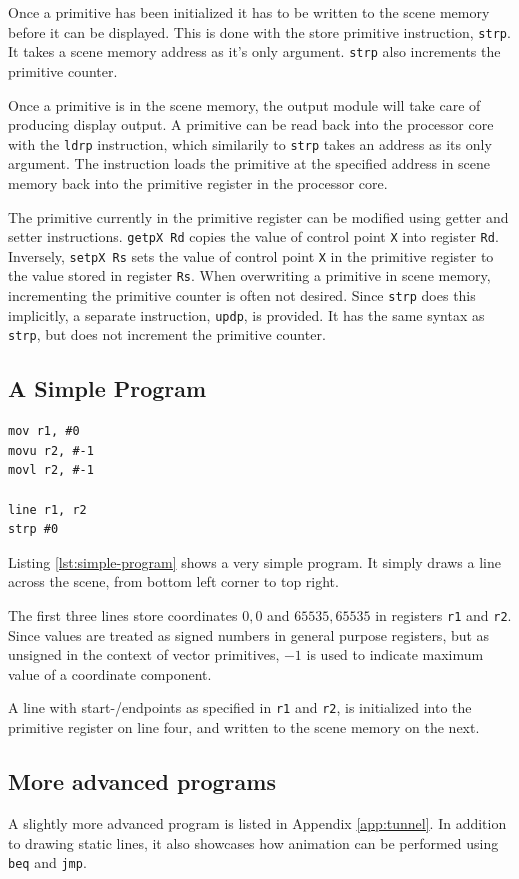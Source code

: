 Once a primitive has been initialized it has to be written to the scene memory before it can be displayed.
This is done with the store primitive instruction, \texttt{strp}.
It takes a scene memory address as it's only argument.
\texttt{strp} also increments the primitive counter.

Once a primitive is in the scene memory, the output module will take care of producing display output.
A primitive can be read back into the processor core with the \texttt{ldrp} instruction, which similarily to \texttt{strp} takes an address as its only argument.
The instruction loads the primitive at the specified address in scene memory back into the primitive register in the processor core.

The primitive currently in the primitive register can be modified using getter and setter instructions.
\texttt{getpX Rd} copies the value of control point \texttt{X} into register \texttt{Rd}.
Inversely, \texttt{setpX Rs} sets the value of control point \texttt{X} in the primitive register to the value stored in register \texttt{Rs}.
When overwriting a primitive in scene memory, incrementing the primitive counter is often not desired.
Since \texttt{strp} does this implicitly, a separate instruction, \texttt{updp}, is provided.
It has the same syntax as \texttt{strp}, but does not increment the primitive counter.

\subsection{A Simple \vthreek Program}

\begin{lstlisting}[label=lst:simple-program]
mov r1, #0
movu r2, #-1
movl r2, #-1

line r1, r2
strp #0
\end{lstlisting}

Listing \ref{lst:simple-program} shows a very simple \vthreek program.
It simply draws a line across the scene, from bottom left corner to top right.

The first three lines store coordinates $0, 0$ and $65535, 65535$ in registers \texttt{r1} and \texttt{r2}.
Since values are treated as signed numbers in general purpose registers, but as unsigned in the context of vector primitives, $-1$ is used to indicate maximum value of a coordinate component.

A line with start-/endpoints as specified in \texttt{r1} and \texttt{r2}, is initialized into the primitive register on line four, and written to the scene memory on the next.

\subsection{More advanced programs}

A slightly more advanced program is listed in Appendix \ref{app:tunnel}.
In addition to drawing static lines, it also showcases how animation can be performed using \texttt{beq} and \texttt{jmp}.
